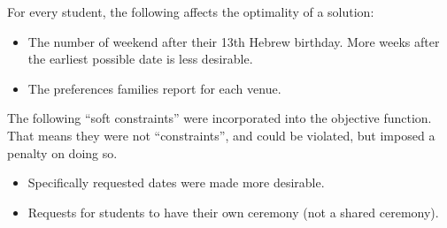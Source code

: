\documentclass[11pt]{article}
\begin{document}
For every student, the following affects the optimality of a solution:

\begin{itemize}
\item The number of weekend after their 13th Hebrew birthday. More weeks after the earliest possible date is less desirable.
\item The preferences families report for each venue.
\end{itemize}

The following ``soft constraints'' were incorporated into the objective function. That means they were not ``constraints'', and could be violated, but imposed a penalty on doing so.

\begin{itemize}
\item Specifically requested dates were made more desirable.
\item Requests for students to have their own ceremony (not a shared ceremony).
\end{itemize}
\end{document}
